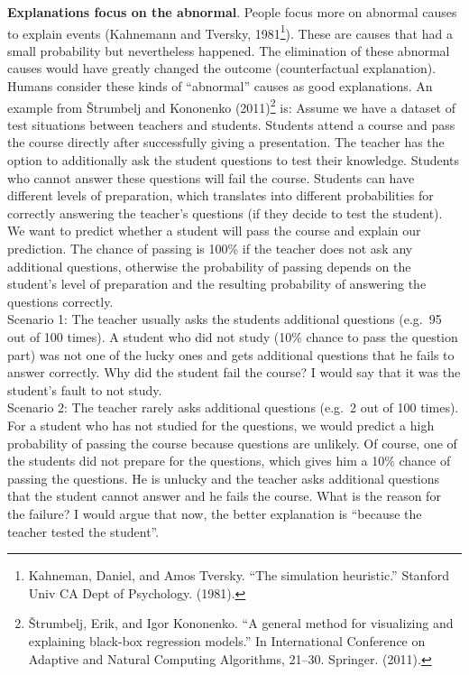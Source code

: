 \documentclass[
  10pt,
]{scrbook}
\begin{document}
\textbf{Explanations focus on the abnormal}.
People focus more on abnormal causes to explain events (Kahnemann and Tversky, 1981\footnote{Kahneman, Daniel, and Amos Tversky. ``The simulation heuristic.'' Stanford Univ CA Dept of Psychology. (1981).}).
These are causes that had a small probability but nevertheless happened.
The elimination of these abnormal causes would have greatly changed the outcome (counterfactual explanation).
Humans consider these kinds of ``abnormal'' causes as good explanations.
An example from Štrumbelj and Kononenko (2011)\footnote{Štrumbelj, Erik, and Igor Kononenko. ``A general method for visualizing and explaining black-box regression models.'' In International Conference on Adaptive and Natural Computing Algorithms, 21--30. Springer. (2011).} is:
Assume we have a dataset of test situations between teachers and students.
Students attend a course and pass the course directly after successfully giving a presentation.
The teacher has the option to additionally ask the student questions to test their knowledge.
Students who cannot answer these questions will fail the course.
Students can have different levels of preparation, which translates into different probabilities for correctly answering the teacher's questions (if they decide to test the student).
We want to predict whether a student will pass the course and explain our prediction.
The chance of passing is 100\% if the teacher does not ask any additional questions, otherwise the probability of passing depends on the student's level of preparation and the resulting probability of answering the questions correctly.\\
Scenario 1:
The teacher usually asks the students additional questions (e.g.~95 out of 100 times).
A student who did not study (10\% chance to pass the question part) was not one of the lucky ones and gets additional questions that he fails to answer correctly.
Why did the student fail the course?
I would say that it was the student's fault to not study.\\
Scenario 2:
The teacher rarely asks additional questions (e.g.~2 out of 100 times).
For a student who has not studied for the questions, we would predict a high probability of passing the course because questions are unlikely.
Of course, one of the students did not prepare for the questions, which gives him a 10\% chance of passing the questions.
He is unlucky and the teacher asks additional questions that the student cannot answer and he fails the course.
What is the reason for the failure?
I would argue that now, the better explanation is ``because the teacher tested the student''.
\end{document}
